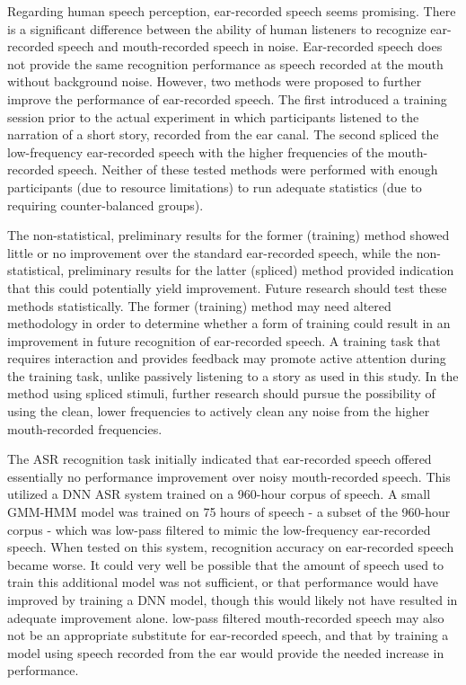 Regarding human speech perception, ear-recorded speech seems promising.  There is a significant difference between the ability of human listeners to recognize ear-recorded speech and mouth-recorded speech in noise.  Ear-recorded speech does not provide the same recognition performance as speech recorded at the mouth without background noise.  However, two methods were proposed to further improve the performance of ear-recorded speech.  The first introduced a training session prior to the actual experiment in which participants listened to the narration of a short story, recorded from the ear canal.  The second spliced the low-frequency ear-recorded speech with the higher frequencies of the mouth-recorded speech.  Neither of these tested methods were performed with enough participants (due to resource limitations) to run adequate statistics (due to requiring counter-balanced groups).  

The non-statistical, preliminary results for the former (training) method showed little or no improvement over the standard ear-recorded speech, while the non-statistical, preliminary results for the latter (spliced) method provided indication that this could potentially yield improvement.  Future research should test these methods statistically.  The former (training) method may need altered methodology in order to determine whether a form of training could result in an improvement in future recognition of ear-recorded speech.  A training task that requires interaction and provides feedback may promote active attention during the training task, unlike passively listening to a story as used in this study.  In the method using spliced stimuli, further research should pursue the possibility of using the clean, lower frequencies to actively clean any noise from the higher mouth-recorded frequencies.  

The ASR recognition task initially indicated that ear-recorded speech offered essentially no performance improvement over noisy mouth-recorded speech. This utilized a DNN ASR system trained on a 960-hour corpus of speech. A small GMM-HMM model was trained on 75 hours of speech - a subset of the 960-hour corpus - which was low-pass filtered to mimic the low-frequency ear-recorded speech.  When tested on this system, recognition accuracy on ear-recorded speech became worse.  It could very well be possible that the amount of speech used to train this additional model was not sufficient, or that performance would have improved by training a DNN model, though this would likely not have resulted in adequate improvement alone.  low-pass filtered mouth-recorded speech may also not be an appropriate substitute for ear-recorded speech, and that by training a model using speech recorded from the ear would provide the needed increase in performance.

